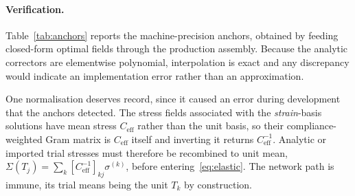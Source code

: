 \paragraph{Verification.} Table~\ref{tab:anchors} reports the
machine-precision anchors, obtained by feeding closed-form optimal fields
through the production assembly. Because the analytic correctors are
elementwise polynomial, interpolation is exact and any discrepancy would
indicate an implementation error rather than an approximation.

\begin{table}[t]
\centering
\caption{Machine-precision verification. Closed-form optimal fields passed
through the production code path must reproduce the exact effective tensor.}
\label{tab:anchors}
\end{table}

One normalisation deserves record, since it caused an error during
development that the anchors detected. The stress fields associated with
the \emph{strain}-basis solutions have mean stress $C_{\mathrm{eff}}$
rather than the unit basis, so their compliance-weighted Gram matrix is
$C_{\mathrm{eff}}$ itself and inverting it returns
$C_{\mathrm{eff}}^{-1}$. Analytic or imported trial stresses must therefore
be recombined to unit mean, $\Sigma(T_j) = \sum_k [C_{\mathrm{eff}}^{-1}]_{kj}
\sigma^{(k)}$, before entering~\eqref{eq:elastic}. The network path is
immune, its trial means being the unit $T_k$ by construction.
